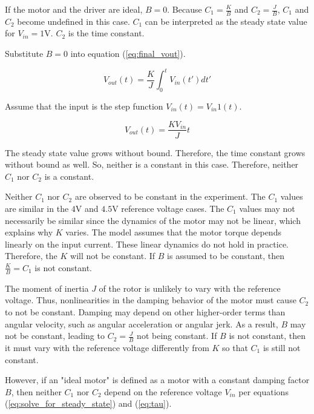 If the motor and the driver are ideal, $B = 0$.
Because $C_1 = \frac{K}{B}$ and $C_2 = \frac{J}{B}$, $C_1$ and $C_2$ become undefined in this case.
$C_1$ can be interpreted as the steady state value for $V_{in} = 1$\si{\volt}.
$C_2$ is the time constant.

Substitute $B = 0$ into equation (\ref{eq:final_vout}).

\begin{equation}
	\label{eq:ideal_vout}
	V_{out}(t) = \frac{K}{J} \int_{0}^{t} V_{in}(t')dt'
\end{equation}

Assume that the input is the step function $V_{in}(t) = V_{in}1(t)$.

\begin{equation}
	\label{eq:ideal_vout_step}
	V_{out}(t) = \frac{K V_{in}}{J} t
\end{equation}

The steady state value grows without bound.
Therefore, the time constant grows without bound as well.
So, neither is a constant in this case.
Therefore, neither $C_1$ nor $C_2$ is a constant.

Neither $C_1$ nor $C_2$ are observed to be constant in the experiment.
The $C_1$ values are similar in the $4$\si{\volt} and $4.5$\si{\volt} reference voltage cases.
The $C_1$ values may not necessarily be similar since the dynamics of the motor may not be linear, which explains why $K$ varies.
The model assumes that the motor torque depends linearly on the input current.
These linear dynamics do not hold in practice.
Therefore, the $K$ will not be constant.
If $B$ is assumed to be constant, then $\frac{K}{B} = C_1$ is not constant.

The moment of inertia $J$ of the rotor is unlikely to vary with the reference voltage.
Thus, nonlinearities in the damping behavior of the motor must cause $C_2$ to not be constant.
Damping may depend on other higher-order terms than angular velocity, such as angular acceleration or angular jerk.
As a result, $B$ may not be constant, leading to $C_2 = \frac{J}{B}$ not being constant.
If $B$ is not constant, then it must vary with the reference voltage differently from $K$ so that $C_1$ is still not constant.

However, if an "ideal motor" is defined as a motor with a constant damping factor $B$, then neither $C_1$ nor $C_2$ depend on the reference voltage $V_{in}$ per equations (\ref{eq:solve_for_steady_state}) and (\ref{eq:tau}).
